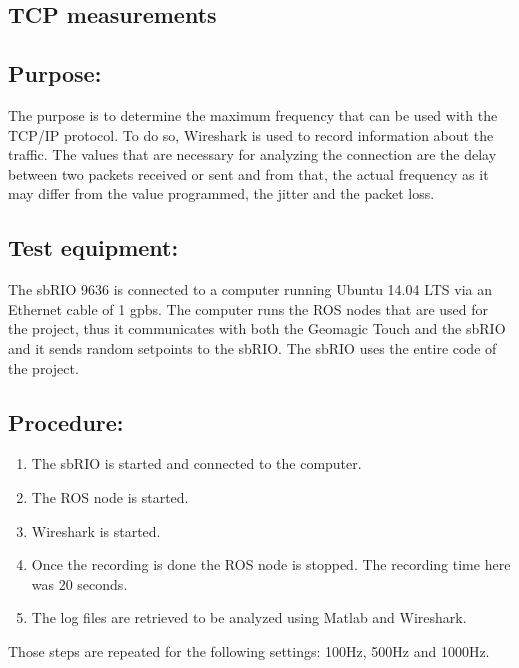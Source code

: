 \subsection{TCP measurements}\label{sec_tcp_mes}


\subsection*{Purpose:}

The purpose is to determine the maximum frequency that can be used with the TCP/IP protocol.  To do so, Wireshark is used to record information about the traffic. The values that are necessary for analyzing the connection are the delay between two packets received or sent and from that, the actual frequency as it may differ from the value programmed, the jitter and the packet loss. 
\subsection*{Test equipment:}

The sbRIO 9636 is connected to a computer running Ubuntu 14.04 LTS via an Ethernet cable of 1 gpbs. The computer runs the ROS nodes that are used for the project, thus it communicates with both the Geomagic Touch and the sbRIO and it sends random setpoints to the sbRIO. The sbRIO uses the entire code of the project.

\subsection*{Procedure:}

\begin{enumerate}
	\item The sbRIO is started and connected to the computer.
	\item The ROS node is started.
	\item Wireshark is started.%
	\item Once the recording is done the ROS node is stopped. The recording time here was 20 seconds.
	\item The log files are retrieved to be analyzed using Matlab and Wireshark.
\end{enumerate}
Those steps are repeated for the following settings: 100Hz, 500Hz and 1000Hz.


